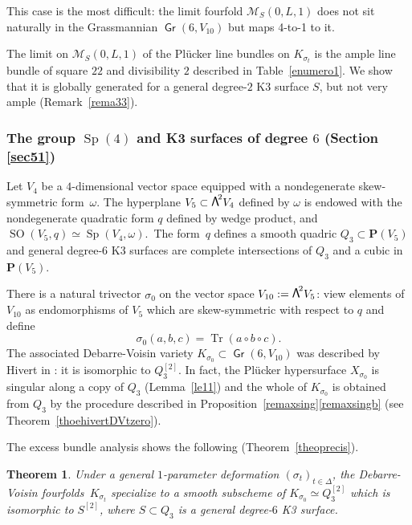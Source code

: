 \documentclass[JEP,XML,SOM,Unicode, NoEqCountersInSection,NoFloatCountersInSection]{cedram}
\let\mathcal\mathscr
\newtheorem{theo}[lemm]{Theorem}
\theoremstyle{definition}
\renewcommand\P{{\mathbf P}}\let\PP\P
\newcommand\cM{\mathcal{M}}
\DeclareMathOperator{\Gr}{\mathsf{Gr}}
\let\isom\simeq
\let\cong\simeq
\DeclareMathOperator{\SO}{SO}
\DeclareMathOperator{\Sp}{Sp}
\DeclareMathOperator{\Tr}{Tr}
\newcommand\bw[1]{{\hbox{\large$\mathsf{\Lambda}$}^{\!#1}}}
\newcommand\hilb{{Q_3^{[2]}}}
\newcommand\hilbS{S^{[2]}}
\begin{document}
This case is the most difficult: the limit fourfold $\cM_S(0,L,1)$ does not sit naturally in the Grassmannian $\Gr(6,V_{10})$ but maps 4-to-1 to it.

{The limit on $\cM_S(0,L,1)$ of the Plücker line bundles on $K_{\sigma_t}$ is the
ample line bundle of square $22$ and divisibility $2$
described in Table~\ref{enumero1}.
We show that it is globally generated for a general degree-$2$ K3 surface $S$, but not very ample (Remark~\ref{rema33}).}

\subsubsection{The group $\Sp(4)$ and K3 surfaces of degree $6$ (Section \ref{sec51})}\label{se112}
Let $V_4$ be a $4$\nobreakdash-dimensional vector space equipped with a nondegenerate skew-symmetric form~$\omega$. The hyperplane
$V_5\subset \bw2V_4 $ defined by $\omega$ is endowed with the nondegenerate quadratic form $q$ defined by wedge product, and
{$\SO(V_5,q)\cong \Sp(V_4,\omega)$.}\ The form~$q$ defines a smooth quadric $Q_3\subset \P(V_5)$ and general degree-$6$ K3 surfaces are complete intersections of $Q_3$ and a cubic in $\P(V_5) $.

There is a natural trivector $\sigma_0$ on
the vector space $V_{10}:=\bw2V_5$:
view
elements of~$V_{10}$ as endomorphisms of $V_5$ which are skew-symmetric with respect to $q$ and define
\begin{equation}\label{si0}
\sigma_0(a, b, c)=\Tr(a\circ b\circ c).
\end{equation}
The associated Debarre-Voisin variety $K_{\sigma_0}\subset \Gr (6, V_{10} ) $ was described by Hivert in \cite{hivert}: it is isomorphic to $\hilb$. In fact, the Plücker hypersurface $X_{\sigma_0}$ is singular along a copy of $Q_3$ (Lemma~\ref{le11}) and the whole of $K_{\sigma_0}$ is obtained from $Q_3$ by the procedure described in Proposition~\ref{remaxsing}\eqref{remaxsingb} (see Theorem~\ref{thoehivertDVtzero}).

The excess bundle analysis shows the following (Theorem~\ref{theoprecis}).

\begin{theo} \label{theohas}
Under a general $1$-parameter deformation
$(\sigma_t)_{t\in \Delta}$, the Debarre-Voisin fourfolds~$K_{\sigma_t}$ specialize to a smooth subscheme of $K_{\sigma_0}\isom \hilb$ which is isomorphic to
$\hilbS$, where $S\subset Q_3$ is a general degree-$6$ K3 surface.
\end{theo}
\end{document}
